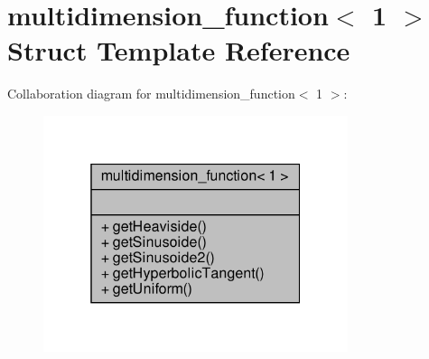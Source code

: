 \hypertarget{structmultidimension__function_3_011_01_4}{}\section{multidimension\+\_\+function$<$ 1 $>$ Struct Template Reference}
\label{structmultidimension__function_3_011_01_4}


Collaboration diagram for multidimension\+\_\+function$<$ 1 $>$\+:\nopagebreak
\begin{figure}[H]
\begin{center}
\leavevmode
\includegraphics[width=253pt]{structmultidimension__function_3_011_01_4__coll__graph}
\end{center}
\end{figure}
